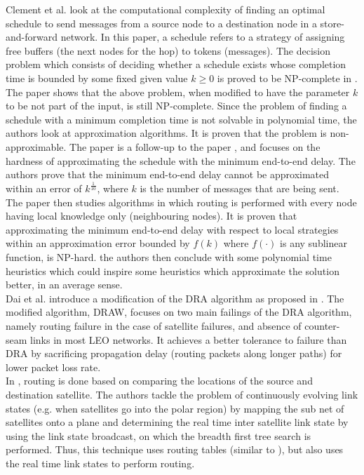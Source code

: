 \documentclass[10pt,conference, final, letterpaper]{IEEEtran}
\begin{document}
Clement et al. \cite{opt_schedule} look at the computational complexity of finding an optimal schedule to send messages from a source node to a destination node in a store-and-forward network. In this paper, a schedule refers to a strategy of assigning free buffers (the next nodes for the hop) to tokens (messages). The decision problem which consists of deciding whether a schedule exists whose completion time is bounded by some fixed given value $k \geq 0$ is proved to be NP-complete in \cite{bovet}. The paper shows that the above problem, when modified to have the parameter $k$ to be not part of  the input, is still NP-complete. Since the problem of finding a schedule with a minimum completion time is not solvable in polynomial time, the authors look at approximation algorithms. It is proven that the problem is non-approximable. 
The paper \cite{hardness_opt_schedule} is a follow-up to the paper \cite{opt_schedule}, and focuses on the hardness of approximating the schedule with the minimum end-to-end delay. The authors prove that the minimum end-to-end delay cannot be approximated within an error of $k^{\frac{1}{10}}$, where $k$ is the number of messages that are being sent. The paper then studies algorithms in which routing is performed with every node having local knowledge only (neighbouring nodes). It is proven that approximating the minimum end-to-end delay with respect to local strategies within an approximation error bounded by $f(k)$ where $f(\cdot)$ is any sublinear function, is NP-hard. the authors then conclude with some polynomial time heuristics which could inspire some heuristics which approximate the solution better, in an average sense. \\
Dai et al.\cite{draw} introduce a modification of the DRA algorithm as proposed in \cite{ekici-datagram}\cite{ekici-dist}. The modified algorithm, DRAW, focuses on two main failings of the DRA algorithm, namely routing failure in the case of satellite failures, and absence of counter-seam links in most LEO networks. It achieves a better tolerance to failure than DRA by sacrificing propagation delay (routing packets along longer paths) for lower packet loss rate. \\
In \cite{breadth_first}, routing is done based on comparing the locations of the source and destination satellite. The authors tackle the problem of continuously evolving link states (e.g. when satellites go into the polar region) by mapping the sub net of satellites onto a plane and determining the real time inter satellite link state by using the link state broadcast, on which the breadth first tree search is performed. Thus, this technique uses routing tables (similar to \cite{ekici-dist}), but also uses the real time link states to perform routing.\\
\end{document}
